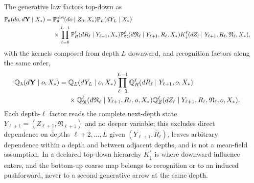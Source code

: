 The generative law factors top-down as
\begin{align}
\mathbb P_\theta(do,d\mathbf Y\mid X_*)
={}&\mathbb P^{\mathrm{obs}}_\theta(do\mid Z_0,X_*)\mathbb P_L(dY_L\mid X_*)
\nonumber\\
&\times\prod_{\ell=0}^{L-1}
\mathbb P^\ell_R(dR_\ell\mid Y_{\ell+1},X_*)
\mathbb P^\ell_{\mathfrak N}(d\mathfrak N_\ell\mid Y_{\ell+1},R_\ell,X_*)
K^\ell_\downarrow(dZ_\ell\mid Y_{\ell+1},R_\ell,\mathfrak N_\ell,X_*),
\label{eq:full-graph-generative-factorization}
\end{align}
with the kernels composed from depth $L$ downward, and recognition factors along the
same order,
\begin{align}
\mathbb Q_\lambda(d\mathbf Y\mid o,X_*)
={}&\mathbb Q_L(dY_L\mid o,X_*)\prod_{\ell=0}^{L-1}
\mathbb Q^\ell_R(dR_\ell\mid Y_{\ell+1},o,X_*)
\nonumber\\
&\times\mathbb Q^\ell_{\mathfrak N}(d\mathfrak N_\ell\mid Y_{\ell+1},R_\ell,o,X_*)
\mathbb Q^\ell_Z(dZ_\ell\mid Y_{\ell+1},R_\ell,\mathfrak N_\ell,o,X_*).
\label{eq:full-graph-recognition-factorization}
\end{align}
Each depth-$\ell$ factor reads the complete next-depth state
$Y_{\ell+1}=(Z_{\ell+1},\mathfrak N_{\ell+1})$ and no deeper variable; this excludes
direct dependence on depths $\ell+2,\ldots,L$ given $(Y_{\ell+1},R_\ell)$, leaves
arbitrary dependence within a depth and between adjacent depths, and is not a
mean-field assumption. In a declared top-down hierarchy
$K^\ell_\downarrow$ is where downward influence enters, and the bottom-up coarse map
belongs to recognition or to an induced pushforward, never to a second generative
arrow at the same depth.

